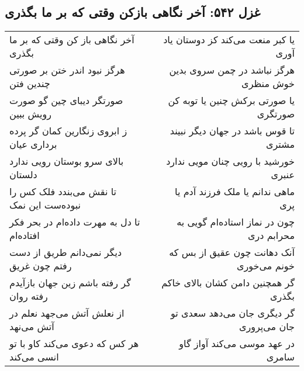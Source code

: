\begin{center}
\section*{غزل ۵۴۲: آخر نگاهی بازکن وقتی که بر ما بگذری}
\label{sec:542}
\begin{longtable}{l p{0.5cm} r}
آخر نگاهی باز کن وقتی که بر ما بگذری
&&
یا کبر منعت می‌کند کز دوستان یاد آوری
\\
هرگز نبود اندر ختن بر صورتی چندین فتن
&&
هرگز نباشد در چمن سروی بدین خوش منظری
\\
صورتگر دیبای چین گو صورت رویش ببین
&&
یا صورتی برکش چنین یا توبه کن صورتگری
\\
ز ابروی زنگارین کمان گر پرده برداری عیان
&&
تا قوس باشد در جهان دیگر نبیند مشتری
\\
بالای سرو بوستان رویی ندارد دلستان
&&
خورشید با رویی چنان مویی ندارد عنبری
\\
تا نقش می‌بندد فلک کس را نبوده‌ست این نمک
&&
ماهی ندانم یا ملک فرزند آدم یا پری
\\
تا دل به مهرت داده‌ام در بحر فکر افتاده‌ام
&&
چون در نماز استاده‌ام گویی به محرابم دری
\\
دیگر نمی‌دانم طریق از دست رفتم چون غریق
&&
آنک دهانت چون عقیق از بس که خونم می‌خوری
\\
گر رفته باشم زین جهان بازآیدم رفته روان
&&
گر همچنین دامن کشان بالای خاکم بگذری
\\
از نعلش آتش می‌جهد نعلم در آتش می‌نهد
&&
گر دیگری جان می‌دهد سعدی تو جان می‌پروری
\\
هر کس که دعوی می‌کند کاو با تو انسی می‌کند
&&
در عهد موسی می‌کند آواز گاو سامری
\\
\end{longtable}
\end{center}
